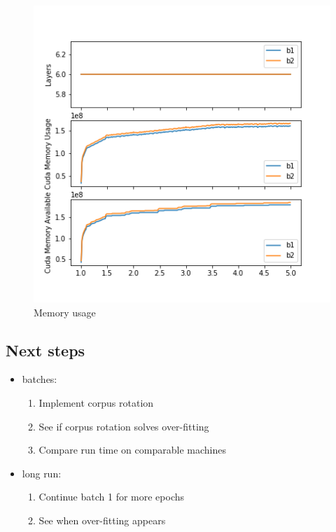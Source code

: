 \begin{figure}[H]
\centering
\includegraphics{parts/appendix/reports-gmsnn/docs_esteban-latex/test_reports/2018-06-13/batch_1_2_memory.png}
\caption{Memory usage}
\end{figure}

\subsection{Next steps}

\begin{itemize}
\item
  batches:

  \begin{enumerate}
  \def\labelenumi{\arabic{enumi}.}
  \item
    Implement corpus rotation
  \item
    See if corpus rotation solves over-fitting
  \item
    Compare run time on comparable machines
  \end{enumerate}
\item
  long run:

  \begin{enumerate}
  \def\labelenumi{\arabic{enumi}.}
  \item
    Continue batch 1 for more epochs
  \item
    See when over-fitting appears
  \end{enumerate}
\end{itemize}
